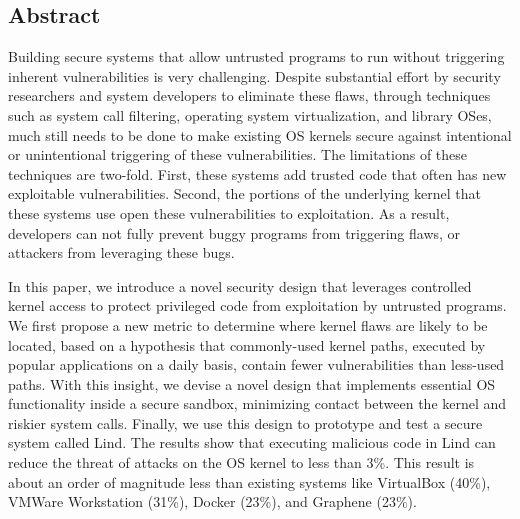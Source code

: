 \subsection*{Abstract}
Building secure systems that allow untrusted programs to run without
triggering inherent vulnerabilities %
is very challenging. 
Despite substantial effort by security researchers and system developers to
eliminate these flaws, through techniques such as system call filtering,
operating system virtualization, and library OSes, much still needs to be done
to make existing OS kernels secure against intentional or unintentional
triggering of these vulnerabilities.
The limitations of these techniques are two-fold.
First, these systems add trusted code that often has new
exploitable vulnerabilities. Second, the portions of the underlying kernel
that these systems use open these vulnerabilities to exploitation.
As a result, developers can not fully prevent buggy programs from triggering
flaws, or attackers from leveraging these bugs.

In this paper, we introduce a novel security design that leverages
controlled kernel access to protect privileged code from exploitation by
untrusted programs.
We first propose a new metric to determine where kernel flaws are
likely to be located, based on a hypothesis that commonly-used kernel
paths, executed by popular applications on a daily basis, contain fewer
vulnerabilities than less-used paths. With this insight, we devise a
novel design that implements essential OS functionality inside a
secure sandbox, minimizing contact between the kernel and riskier system calls.
Finally, we use this design to prototype and test a secure system called Lind.
The results show that executing malicious code in Lind can reduce the threat of
attacks on the OS kernel to less than 3\%.
This result is about an order of magnitude less than existing systems like VirtualBox (40\%),
VMWare Workstation (31\%), Docker (23\%), and Graphene (23\%).